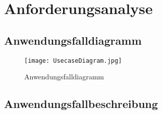 \section{Anforderungsanalyse}
\subsection{Anwendungsfalldiagramm}
\begin{figure}[ !h] \centering
\texttt{[image: UsecaseDiagram.jpg]}
\caption[Anwendungsfalldiagramm]{Anwendungsfalldiagramm}\label{fig:Anwendungsfalldiagramm}
\end{figure}

\subsection{Anwendungsfallbeschreibung}
